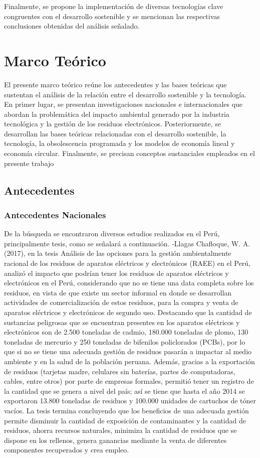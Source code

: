 \documentclass[stu,12pt,a4paper]{apa7}
\begin{document}
Finalmente, se propone la implementación de diversas tecnologías clave congruentes con el desarrollo sostenible y se mencionan las respectivas conclusiones obtenidas del análisis señalado.

    \section{Marco Teórico}
    El presente marco teórico reúne los antecedentes y las bases teóricas que sustentan el análisis de la relación entre el desarrollo sostenible y la tecnología. En primer lugar, se presentan investigaciones nacionales e internacionales que abordan la problemática del impacto ambiental generado por la industria tecnológica y la gestión de los residuos electrónicos. Posteriormente, se desarrollan las bases teóricas relacionadas con el desarrollo sostenible, la tecnología, la obsolescencia programada y los modelos de economía lineal y economía circular. Finalmente, se precisan conceptos sustanciales empleados en el presente trabajo
    \subsection{Antecedentes}
    
    \subsubsection{Antecedentes Nacionales}
    De la búsqueda se encontraron diversos estudios realizados en el Perú, principalmente tesis, como se señalará a continuación.
-Llagas Chafloque, W. A. (2017), en la tesis Análisis de las opciones para la gestión ambientalmente racional de los residuos de aparatos eléctricos y electrónicos (RAEE) en el Perú, analizó el impacto que podrían tener los residuos de aparatos eléctricos y electrónicos en el Perú, considerando que no se tiene una data completa sobre los residuos, en vista de que existe un sector informal en donde se desarrollan actividades de comercialización de estos residuos, para la compra y venta de aparatos eléctricos y electrónicos de segundo uso. Destacando que la cantidad de sustancias peligrosas que se encuentran presentes en los aparatos eléctricos y electrónicos son de 2.500 toneladas de cadmio, 180.000 toneladas de plomo, 130 toneladas de mercurio y 250 toneladas de bifenilos policlorados (PCBs), por lo que si no se tiene una adecuada gestión de residuos pasarán a impactar al medio ambiente y en la salud de la población peruana. Además, gracias a la exportación de residuos (tarjetas madre, celulares sin baterías, partes de computadoras, cables, entre otros) por parte de empresas formales, permitió tener un registro de la cantidad que se genera a nivel del país; así se tiene que hasta el año 2014 se exportaron 13.800 toneladas de residuos y 100.000 unidades de cartuchos de tóner vacíos. La tesis termina concluyendo que los beneficios de una adecuada gestión permite disminuir la cantidad de exposición de contaminantes y la cantidad de residuos, ahorra recursos naturales, minimiza la cantidad de residuos que se dispone en los rellenos, genera ganancias mediante la venta de diferentes componentes recuperados y crea empleo.
\end{document}

